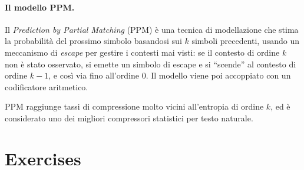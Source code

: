 \documentclass[12pt, a4paper, oneside]{book}
\theoremstyle{plain}
\theoremstyle{definition}
\theoremstyle{remark}
\begin{document}
\paragraph{Il modello PPM.}
Il \emph{Prediction by Partial Matching} (PPM) è una tecnica di modellazione che stima la probabilità del prossimo simbolo basandosi sui $k$ simboli precedenti, usando un meccanismo di \emph{escape} per gestire i contesti mai visti: se il contesto di ordine $k$ non è stato osservato, si emette un simbolo di escape e si ``scende'' al contesto di ordine $k - 1$, e così via fino all'ordine 0. Il modello viene poi accoppiato con un codificatore aritmetico.

PPM raggiunge tassi di compressione molto vicini all'entropia di ordine $k$, ed è considerato uno dei migliori compressori statistici per testo naturale.

\section{Exercises}
\end{document}
